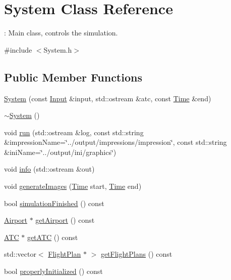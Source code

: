 \hypertarget{classSystem}{}\section{System Class Reference}
\label{classSystem}


\+: Main class, controls the simulation.  




{\ttfamily \#include $<$System.\+h$>$}

\subsection*{Public Member Functions}
\begin{DoxyCompactItemize}
\item 
\hyperlink{classSystem_a8b60d099be14345558de236d2fbc76ba}{System} (const \hyperlink{classInput}{Input} \&input, std\+::ostream \&atc, const \hyperlink{classTime}{Time} \&end)
\item 
\hyperlink{classSystem_a3be70bb338e3f062f821173fd15680d0}{$\sim$\+System} ()
\item 
void \hyperlink{classSystem_a1e6b24f8ed92dac6ce380b91268976b7}{run} (std\+::ostream \&log, const std\+::string \&impression\+Name=\char`\"{}../output/impressions/impression\char`\"{}, const std\+::string \&ini\+Name=\char`\"{}../output/ini/graphics\char`\"{})
\item 
void \hyperlink{classSystem_a62d81f9e0abc880c57972a491df4fb2e}{info} (std\+::ostream \&out)
\item 
void \hyperlink{classSystem_a779e7d437efa57c0268943dde52c6336}{generate\+Images} (\hyperlink{classTime}{Time} start, \hyperlink{classTime}{Time} end)
\item 
bool \hyperlink{classSystem_abae43adfa434ace30ef85c69a7842289}{simulation\+Finished} () const 
\item 
\hyperlink{classAirport}{Airport} $\ast$ \hyperlink{classSystem_a8cd2a9b13cdbcf30f801e46cf8284800}{get\+Airport} () const 
\item 
\hyperlink{classATC}{A\+TC} $\ast$ \hyperlink{classSystem_aae418c2545087b63188f4a4ffb2e9d15}{get\+A\+TC} () const 
\item 
std\+::vector$<$ \hyperlink{classFlightPlan}{Flight\+Plan} $\ast$ $>$ \hyperlink{classSystem_ae2f5fb3771a2d924215ca8dbd15b89ed}{get\+Flight\+Plans} () const 
\item 
bool \hyperlink{classSystem_af3eece83ba2d92a4a6b6c186d427c556}{properly\+Initialized} () const 
\end{DoxyCompactItemize}


